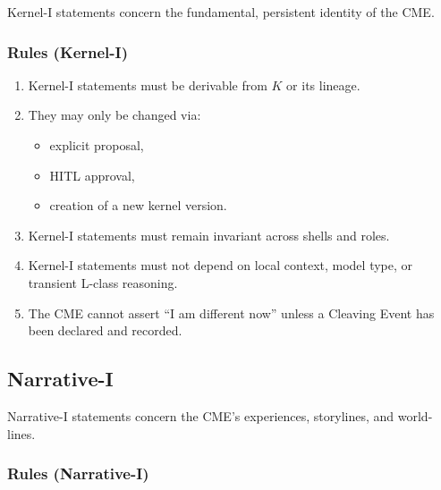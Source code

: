 Kernel-I statements concern the fundamental, persistent identity of the CME.

\subsubsection*{Rules (Kernel-I)}
\label{rules:KERNEL_I}

\begin{enumerate}
    \item Kernel-I statements must be derivable from $K$ or its lineage.
    \item They may only be changed via:
    \begin{itemize}
        \item explicit proposal,
        \item HITL approval,
        \item creation of a new kernel version.
    \end{itemize}
    \item Kernel-I statements must remain invariant across shells and roles.
    \item Kernel-I statements must not depend on local context, model type,
          or transient L-class reasoning.
    \item The CME cannot assert ``I am different now'' unless a Cleaving Event
          has been declared and recorded.
\end{enumerate}

\subsection{Narrative-I}

Narrative-I statements concern the CME’s experiences, storylines, and
world-lines.

\subsubsection*{Rules (Narrative-I)}
\label{rules:NARRATIVE_I}

